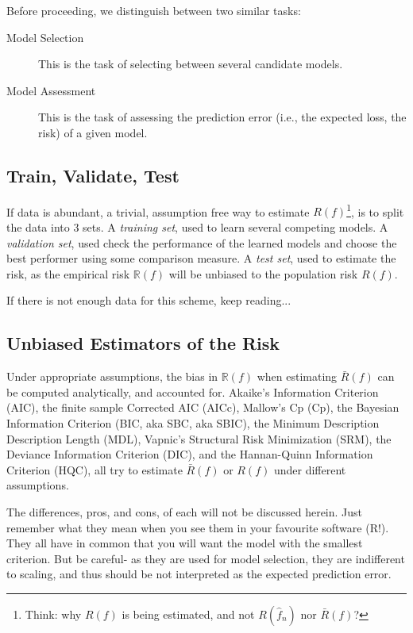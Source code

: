\documentclass[12pt,a4paper]{article}
\theoremstyle{plain}
\theoremstyle{definition}
\newcommand{\risk}{R}
\newcommand{\riskn}{\mathbb{R}}
\newcommand{\hyp}{f}
\newcommand{\test}{\risk(\hyp)}
\newcommand{\train}{\riskn(\hyp)}
\newcommand{\insample}{\bar{\risk}(\hyp)}
\newcommand{\EPE}{\risk(\hat{\hyp}_n)}
\begin{document}
Before proceeding, we distinguish between two similar tasks: 
\begin{description}
\item[Model Selection] This is the task of selecting between several candidate models.
\item[Model Assessment] This is the task of assessing the prediction error (i.e., the expected loss, the risk) of a given model.
\end{description}



\subsection{Train, Validate, Test}
\label{sec:train_test}
If data is abundant, a trivial, assumption free way to estimate $\test$\footnote{Think: why $\test$ is being estimated, and not $\EPE$ nor $\insample$?}, is to split the data into $3$ sets.
A \emph{training set}, used to learn several competing models.
A \emph{validation set}, used check the performance of the learned models and choose the best performer using some comparison measure. 
A \emph{test set}, used to estimate the risk, as the empirical risk $\train$ will be unbiased to the population risk $\test$.

If there is not enough data for this scheme, keep reading...


\subsection{Unbiased Estimators of the Risk}
\label{sec:risk_estimation}
Under appropriate assumptions, the bias in $\train$ when estimating $\insample$ can be computed analytically, and accounted for.
Akaike's Information Criterion (AIC), 
the finite sample Corrected AIC (AICc), 
Mallow's Cp (Cp), 
the Bayesian Information Criterion (BIC, aka SBC, aka SBIC), 
the Minimum Description Description Length (MDL), 
Vapnic's Structural Risk Minimization (SRM), 
the Deviance Information Criterion (DIC), 
and the Hannan-Quinn Information Criterion (HQC), 
all try to estimate $\insample$ or $\test$ under different assumptions.

The differences, pros, and cons, of each will not be discussed herein. Just remember what they mean when you see them in your favourite software (R!).
They all have in common that you will want the model with the smallest criterion.
But be careful- as they are used for model selection, they are indifferent to scaling, and thus should be not interpreted as the expected prediction error.
\end{document}
